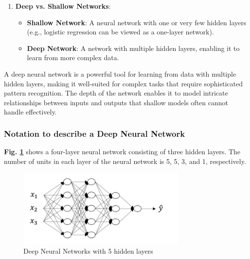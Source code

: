 \documentclass[letterpaper,12pt,notitlepage,twoside]{report}
\begin{document}
\begin{enumerate}
    \item \textbf{Deep vs. Shallow Networks}:
    \begin{itemize}
        \item \textbf{Shallow Network}: A neural network with one or very few hidden layers (e.g., logistic regression can be viewed as a one-layer network).
        \item \textbf{Deep Network}: A network with multiple hidden layers, enabling it to learn from more complex data.
    \end{itemize}
\end{enumerate}

\begin{example}
A deep neural network is a powerful tool for learning from data with multiple hidden layers, making it well-suited for complex tasks that require sophisticated pattern recognition. The depth of the network enables it to model intricate relationships between inputs and outputs that shallow models often cannot handle effectively.
\end{example}

\subsubsection{Notation to describe a Deep Neural Network}
\textbf{Fig. \ref{fig:16}} shows a four-layer neural network consisting of three hidden layers. The number of units in each layer of the neural network is 5, 5, 3, and 1, respectively.  
\begin{figure}[h]
	\centering
	\includegraphics[width=0.75\textwidth]{Images/Deep Neural Network.png}
	\caption{Deep Neural Networks with 5 hidden layers}
	\label{fig:16}
\end{figure}
\FloatBarrier
\end{document}
